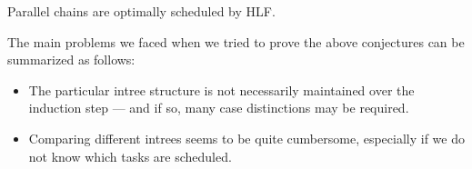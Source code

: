 \begin{conjecture}
  Parallel chains are optimally scheduled by HLF.
\end{conjecture}

The main problems we faced when we tried to prove the above conjectures can be summarized as follows:
\begin{itemize}
\item The particular intree structure is not necessarily maintained over the induction step --- and if so, many case distinctions may be required.
\item Comparing different intrees seems to be quite cumbersome, especially if we do not know which tasks are scheduled.
\end{itemize}



